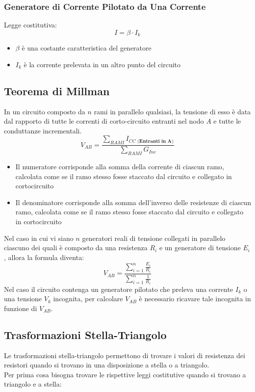 \documentclass[../main.tex]{subfiles}
\begin{document}
	\subsubsection{Generatore di Corrente Pilotato da Una Corrente}
	Legge costitutiva:
	\begin{equation}
		I = \beta \cdot I_k
	\end{equation}
	\begin{itemize}
	\item $\beta$ è una costante caratteristica del generatore
	\item $I_k$ è la corrente prelevata in un altro punto del circuito
	\end{itemize}
	\subsection{Teorema di Millman}
	\begin{theorem}
		In un circuito composto da $n$ rami in parallelo qualsiasi, la tensione di esso è data dal rapporto di tutte le correnti di corto-circuito entranti nel nodo $A$ e tutte le conduttanze incrementali.
		\begin{equation}
			V_{AB} = \frac{\sum_{RAMI} I_{CC\textbf{ (Entranti in A)}}}{\sum_{RAMI} G_{Inc}}
		\end{equation}
		\begin{itemize}
			\item Il numeratore corrisponde alla somma della corrente di ciascun ramo, calcolata come se il ramo stesso fosse staccato dal circuito e collegato in cortocircuito
			\item Il denominatore corrisponde alla somma dell’inverso delle resistenze di ciascun ramo, calcolata come se il ramo stesso fosse staccato dal circuito e collegato in cortocircuito
		\end{itemize}
	\end{theorem}
	Nel caso in cui vi siano $n$ generatori reali di tensione collegati in parallelo ciascuno dei quali è composto da una resistenza $R_i$ e un generatore di tensione $E_i$, allora la formula diventa:
	\begin{equation}
		V_{AB} = \frac{\sum_{i=1}^{n} \frac{E_i}{R_i}}{\sum_{i=1}^{n} \frac{1}{R_i}}
	\end{equation}
	Nel caso il circuito contenga un generatore pilotato che preleva una corrente $I_k$ o una tensione $V_k$ incognita, per calcolare $V_{AB}$ è necessario ricavare tale incognita in funzione di $V_{AB}$.
	\subsection{Trasformazioni Stella-Triangolo}
	Le trasformazioni stella-triangolo permettono di trovare i valori di resistenza dei resistori quando si trovano in una disposizione a stella o a triangolo.\\
	Per prima cosa bisogna trovare le rispettive leggi costitutive quando si trovano a triangolo e a stella:
\end{document}
